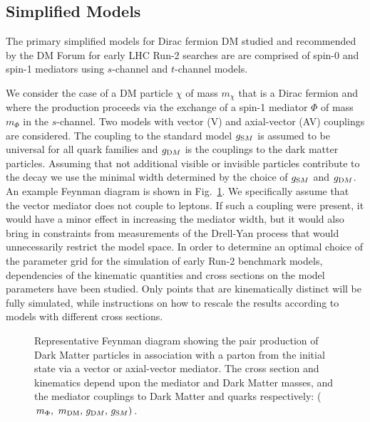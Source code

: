 \subsection{Simplified Models}


The primary simplified models for Dirac fermion DM studied and recommended by the DM Forum for early LHC Run-2 searches are are comprised of spin-0 and spin-1 mediators using $s$-channel and $t$-channel models.

We consider the case of a DM particle $\chi$ of mass $m_{\chi}$ that is a Dirac fermion and where the production proceeds via the exchange
of a spin-1 mediator $\Phi$ of mass $m_{\Phi}$ in the $s$-channel. Two models with vector (V) and axial-vector (AV) couplings are considered. The coupling to the standard model
$g_{\textrm SM}$ is assumed to be universal for all quark families and $g_{\textrm DM}$ is the couplings to the dark matter particles. Assuming that not additional visible or invisible particles contribute to the decay we use the minimal width determined by the choice of $g_{\textrm SM}$ and $g_{\textrm DM}$. An example Feynman diagram is shown in Fig.~\ref{fig:feynman}.
We specifically assume that the vector mediator does not couple to leptons. If such a coupling were present, it would have a minor effect in increasing the mediator width, but it
would also bring in constraints from measurements of the Drell-Yan process that would unnecessarily restrict the model space. 
 In order to determine an optimal choice of the parameter grid for the simulation of early Run-2 benchmark models, dependencies of the kinematic quantities and cross sections on the model parameters
have been studied. Only points that are kinematically distinct will be fully simulated, while instructions on how to rescale the results
according to models with different cross sections. 

\begin{figure}[h!]
  \centering
  \caption{Representative Feynman diagram showing the pair production of Dark Matter particles in association with a parton from the initial state via a vector or axial-vector mediator. The cross section and kinematics depend upon the mediator and Dark Matter masses, and the mediator couplings to Dark Matter and quarks respectively: ($m_{\Phi} ,\ m_\textrm{DM} ,\, g_{\textrm DM} ,\, g_{\textrm SM})$. \cite{Abercrombie:2015wmb}}
  \label{fig:feynman}
\end{figure}

